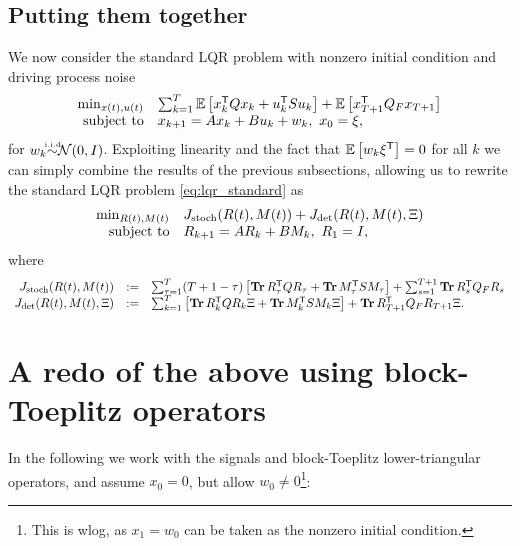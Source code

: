 \documentclass[11pt]{article}
\numberwithin{equation}{section}
\begin{document}
\subsection{Putting them together}
We now consider the standard LQR problem with nonzero initial condition and driving process noise
\begin{equation}
\begin{array}{rl}
\min_{x(t),u(t)} & \sum_{k=1}^T \mathbb{E}\left[x_k^{\mathsf{T}} Qx_k + u_k^{\mathsf{T}} Su_k\right]+ \mathbb{E}\left[x_{T+1}^{\mathsf{T}} Q_F x_{T+1}\right]\\
\mbox{subject to} & x_{k+1} = Ax_k + Bu_k + w_k, \ x_0 = \xi,
\end{array}
\label{eq:lqr_standard}
\end{equation}
for $w_k {\iid}\mathcal{N}(0,I)$.  Exploiting linearity and the fact that $\mathbb{E}\left[ w_k\xi^{\mathsf{T}}\right] = 0$ for all $k$ we can simply combine the results of the previous subsections, allowing us to rewrite the standard LQR problem \eqref{eq:lqr_standard} as
\begin{equation}
\begin{array}{rl}
\min_{R(t),M(t)} & J_\mathrm{stoch}(R(t),M(t)) + J_\mathrm{det}(R(t),M(t),\Xi) \\
\mbox{subject to} & R_{k+1} = AR_k + BM_k, \ R_1 = I,
\end{array}
\label{eq:sls_LQR}
\end{equation}
where 
\begin{equation}
\begin{array}{rcl}
J_\mathrm{stoch}(R(t),M(t)) &:=& \sum_{\tau=1}^T (T+1-\tau)\left[\operatorname*{\mathbf{Tr}} R_\tau^{\mathsf{T}} Q R_\tau + \operatorname*{\mathbf{Tr}} M_\tau^{\mathsf{T}} S M_\tau\right] + \sum_{s=1}^{T+1} \operatorname*{\mathbf{Tr}} R_s^{\mathsf{T}} Q_F R_s \\
J_\mathrm{det}(R(t),M(t),\Xi) &:=& \sum_{k=1}^T\left[\operatorname*{\mathbf{Tr}} R_k^{\mathsf{T}} Q R_k\Xi + \operatorname*{\mathbf{Tr}} M_k^{\mathsf{T}} S M_k\Xi\right] +  \operatorname*{\mathbf{Tr}} R_{T+1}^{\mathsf{T}} Q_F R_{T+1}\Xi.
\end{array}
\end{equation}

\section{A redo of the above using block-Toeplitz operators}
In the following we work with the signals and block-Toeplitz lower-triangular operators, and assume $x_0 = 0$, but allow $w_0 \neq 0$\footnote{This is wlog, as $x_1 = w_0$ can be taken as the nonzero initial condition.}:
\end{document}
